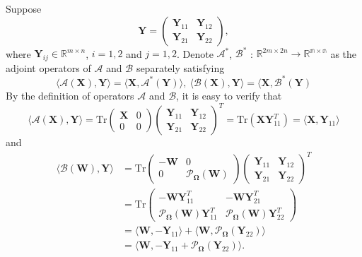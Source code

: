 \documentclass{article}
\begin{document}
{Suppose
\begin{equation*}
    \mathbf Y = \begin{pmatrix}
        \mathbf Y_{11} &\mathbf Y_{12} \\
        \mathbf Y_{21} &\mathbf Y_{22}
    \end{pmatrix},
\end{equation*}
where $\mathbf Y_{ij} \in \mathbb{R}^{m \times n}$, $i=1,2$ and $j=1,2$. Denote $\mathcal{A}^*$, $\mathcal{B}^*$ : $\mathbb{R}^{2m \times 2n} \rightarrow \mathbb{R^{m \times n}} $ as the adjoint operators of $\mathcal{A}$ and $\mathcal{B}$ separately satisfying 
\begin{equation}
    \langle \mathcal{A}(\mathbf X),\mathbf Y \rangle = \langle \mathbf X,\mathcal{A}^*(\mathbf Y) \rangle,\ \langle \mathcal{B}(\mathbf X),\mathbf Y \rangle =  \langle \mathbf X,\mathcal{B}^*(\mathbf Y)
    \label{adjopt}
\end{equation}
By the definition of operators $\mathcal{A}$ and $\mathcal{B}$, it is easy to verify that
\begin{equation*}
    \langle \mathcal{A}(\mathbf X),\mathbf Y \rangle = \text{Tr}\begin{pmatrix}
        \mathbf X & 0 \\
        0 & 0 
    \end{pmatrix}\begin{pmatrix}
        \mathbf Y_{11} & \mathbf Y_{12} \\
        \mathbf Y_{21} & \mathbf Y_{22}
    \end{pmatrix}^T = \text{Tr}(\mathbf X\mathbf Y_{11}^T) = \langle \mathbf X,\mathbf Y_{11} \rangle
\end{equation*}
and 
\begin{equation*}
    \begin{aligned}
        \langle \mathcal{B}(\mathbf W),\mathbf Y \rangle & = \text{Tr}\begin{pmatrix}
            -\mathbf W & 0 \\
            0 & \mathcal{P}_{\mathbf\Omega}(\mathbf W) 
        \end{pmatrix}\begin{pmatrix}
            \mathbf Y_{11} & \mathbf Y_{12} \\
            \mathbf Y_{21} & \mathbf Y_{22}
        \end{pmatrix}^T \\
        & = \text{Tr}\begin{pmatrix}
            -\mathbf W\mathbf Y_{11}^T & -\mathbf W\mathbf Y_{21}^T \\
            \mathcal{P}_{\mathbf\Omega}(\mathbf W)\mathbf Y_{11}^T & \mathcal{P}_{\mathbf\Omega}(\mathbf W)\mathbf Y_{22}^T
        \end{pmatrix}\\
        &= \langle\mathbf W, -\mathbf Y_{11} \rangle + \langle\mathbf W, \mathcal{P}_{\mathbf\Omega}(\mathbf Y_{22}) \rangle \\
        & = \langle\mathbf W, -\mathbf Y_{11}+ \mathcal{P}_{\mathbf\Omega}(\mathbf Y_{22})  \rangle.
    \end{aligned}
\end{equation*}

}
\end{document}
